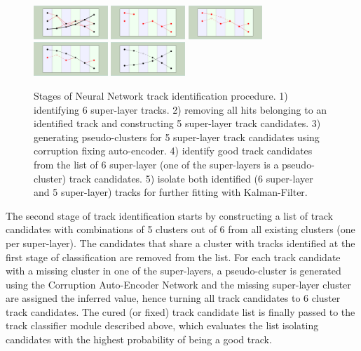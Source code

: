 \documentclass[aps,prl,preprint,12pt]{revtex4}
\begin{document}
 \begin{figure}[!h]
\begin{center}
 \includegraphics[angle=90,width=1.1in]{images/iden_6_sl.pdf}
  \includegraphics[angle=90,width=1.1in]{images/iden_5_sl_a.pdf}
    \includegraphics[angle=90,width=1.1in]{images/iden_5_sl_b.pdf}
      \includegraphics[angle=90,width=1.1in]{images/iden_5_sl_c.pdf}
            \includegraphics[angle=90,width=1.1in]{images/iden_5_sl_d.pdf}
            
\caption {Stages of Neural Network track identification procedure. 1) identifying 6 super-layer tracks. 2) 
removing all hits belonging to an identified track and constructing 5 super-layer track candidates. 
3) generating pseudo-clusters for 5 super-layer track candidates using corruption fixing auto-encoder. 
4) identify good track candidates from the list of 6 super-layer (one of the super-layers is a pseudo-cluster) 
track candidates. 5) isolate both identified (6 super-layer and 5 super-layer) tracks  for further fitting with 
Kalman-Filter.}
 \label{network:procedure}
 \end{center}
\end{figure}

The second stage of track identification starts by constructing a list of track candidates with combinations 
of 5 clusters out of 6 from all existing clusters (one per super-layer). The candidates that share a cluster with 
tracks identified at the first stage of classification are removed from the list. For each track candidate with a 
missing cluster in one of the super-layers, a pseudo-cluster is generated using the Corruption Auto-Encoder 
Network and the missing super-layer cluster are assigned the inferred value, hence turning all track candidates 
to 6 cluster track candidates. The cured (or fixed) track candidate list is finally passed to the track classifier 
module described above, which evaluates the list isolating candidates with the highest probability of being a 
good track. 
\end{document}
